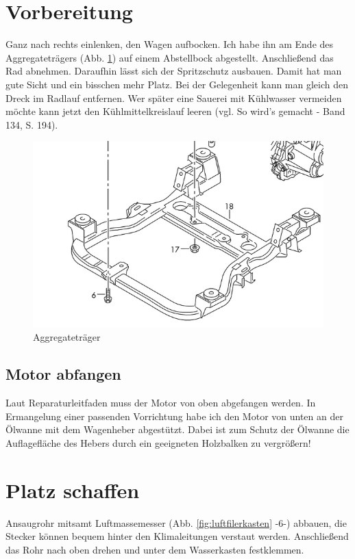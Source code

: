 \documentclass[twoside,a4paper]{refart}
\begin{document}
\section{Vorbereitung}
Ganz nach rechts einlenken, den Wagen aufbocken. Ich habe ihn am Ende des Aggregateträgers (Abb. \ref{fig:aggregateträger}) auf einem Abstellbock abgestellt.
Anschließend das Rad abnehmen. Daraufhin lässt sich der Spritzschutz ausbauen. Damit hat man gute Sicht und ein bisschen mehr Platz. Bei der Gelegenheit kann man gleich den Dreck im Radlauf entfernen.
Wer später eine Sauerei mit Kühlwasser vermeiden möchte kann jetzt den Kühlmittelkreislauf leeren (vgl. So wird's gemacht - Band 134, S. 194).
\begin{figure}[htb]
	\begin{center}
		\includegraphics[width=\textwidth]{Aggregatetraeger}
		\caption{Aggregateträger}
		\label{fig:aggregateträger}
	\end{center}
\end{figure}

\subsection{Motor abfangen}
Laut Reparaturleitfaden muss der Motor von oben abgefangen werden. In Ermangelung einer passenden Vorrichtung habe ich den Motor von unten an der Ölwanne mit dem Wagenheber abgestützt. Dabei ist zum Schutz der Ölwanne die Auflagefläche des Hebers durch ein geeigneten Holzbalken zu vergrößern!
 
\newpage
\section{Platz schaffen}
Ansaugrohr mitsamt Luftmassemesser (Abb. \ref{fig:luftfilerkasten} -6-) abbauen, die Stecker können bequem hinter den Klimaleitungen verstaut werden. Anschließend das Rohr nach oben drehen und unter dem Wasserkasten festklemmen.\\
\end{document}
